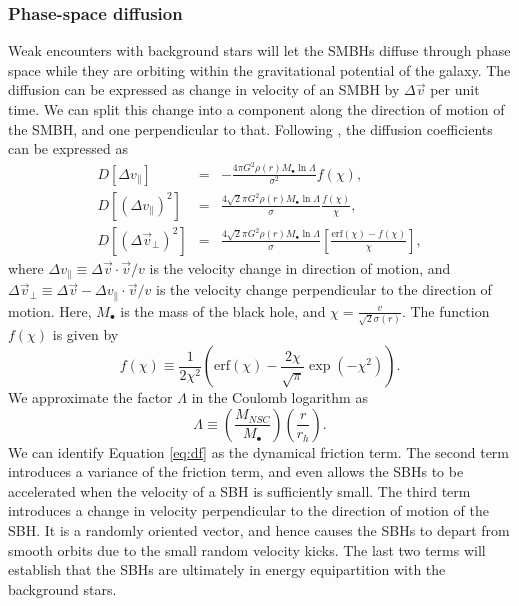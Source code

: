 \documentclass[english, apj]{emulateapj}
\begin{document}
\subsubsection{Phase-space diffusion} \label{psd}
Weak encounters with background stars will let the SMBHs diffuse through phase space while they are orbiting within the gravitational potential of the galaxy. The diffusion can be expressed as change in velocity of an SMBH by $\Delta \vec{v}$ per unit time. We can split this change into a component along the direction of motion of the SMBH, and one perpendicular to that. Following \citet{2008gady.book.....B}, the diffusion coefficients can be expressed as 
\begin{eqnarray}\label{eq:df}
D[\Delta v_\parallel] & = & -\frac{4\pi G^2\rho(r)M_\bullet\ln\Lambda}{\sigma^2}f(\chi),\\
D[(\Delta v_\parallel)^2] & = & \frac{4\sqrt{2}\pi G^2\rho(r)M_\bullet\ln\Lambda}{\sigma}\frac{f(\chi)}{\chi},\\
D[(\Delta \vec{v}_\bot)^2] & = & \frac{4\sqrt{2}\pi G^2\rho(r)M_\bullet\ln\Lambda}{\sigma}\left[\frac{\mbox{erf}(\chi)-f(\chi)}{\chi}\right],
\end{eqnarray} 
where $\Delta v_\parallel \equiv \Delta \vec{v}\cdot\vec{v}/v$ is the velocity change in direction of motion, and $\Delta \vec{v}_\bot \equiv \Delta \vec{v} - \Delta v_\parallel \cdot\vec{v}/v$ is the velocity change perpendicular to the direction of motion. Here, $M_\bullet$ is the mass of the black hole, and $\chi = \frac{v}{\sqrt{2}\sigma(r)}$. The function $f(\chi)$ is given by 
\begin{equation}
f(\chi) \equiv \frac{1}{2\chi^2}\left(\mbox{erf}(\chi)-\frac{2\chi}{\sqrt{\pi}}\exp\left(-\chi^2\right)\right).
\end{equation}
We approximate the factor $\Lambda$ in the Coulomb logarithm as
\begin{equation}
\Lambda \equiv \left(\frac{M_{NSC}}{M_\bullet}\right)\left(\frac{r}{r_h}\right).
\end{equation}
We can identify Equation \ref{eq:df} as the dynamical friction term. The second term introduces a variance of the friction term, and even allows the SBHs to be accelerated when the velocity of a SBH is sufficiently small. The third term introduces a change in velocity perpendicular to the direction of motion of the SBH. It is a randomly oriented vector, and hence causes the SBHs to depart from smooth orbits due to the small random velocity kicks. The last two terms will establish that the SBHs are ultimately in energy equipartition with the background stars.
\end{document}
